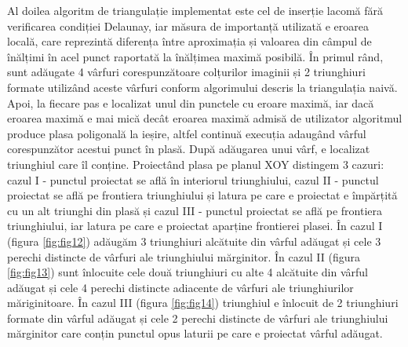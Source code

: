 \documentclass[12pt]{article}
\begin{document}
Al doilea algoritm de triangulație implementat este cel de inserție lacomă fără verificarea condiției Delaunay, iar măsura de importanță utilizată e eroarea locală, care reprezintă diferența între aproximația și valoarea din câmpul de înălțimi în acel punct raportată la înălțimea maximă posibilă. În primul rând, sunt adăugate 4 vârfuri corespunzătoare colțurilor imaginii și 2 triunghiuri formate utilizând aceste vârfuri conform algorimului descris la triangulația naivă. Apoi, la fiecare pas e localizat unul din punctele cu eroare maximă, iar dacă eroarea maximă e mai mică decât eroarea maximă admisă de utilizator algoritmul produce plasa poligonală la ieșire, altfel continuă execuția adaugând vârful corespunzător acestui punct în plasă. După adăugarea unui vârf, e localizat triunghiul care îl conține. Proiectând plasa pe planul XOY distingem 3 cazuri: cazul I - punctul proiectat se află în interiorul triunghiului, cazul II - punctul proiectat se află pe frontiera triunghiului și latura pe care e proiectat e împărțită cu un alt triunghi din plasă și cazul III - punctul proiectat se află pe frontiera triunghiului, iar latura pe care e proiectat aparține frontierei plasei. În cazul I (figura \ref{fig:fig12}) adăugăm 3 triunghiuri alcătuite din vârful adăugat și cele 3 perechi distincte de vârfuri ale triunghiului mărginitor. În cazul II (figura \ref{fig:fig13}) sunt înlocuite cele două triunghiuri cu alte 4 alcătuite din vârful adăugat și cele 4 perechi distincte adiacente de vârfuri ale triunghiurilor măriginitoare. În cazul III (figura \ref{fig:fig14}) triunghiul e înlocuit de 2 triunghiuri formate din vârful adăugat și cele 2 perechi distincte de vârfuri ale triunghiului mărginitor care conțin punctul opus laturii pe care e proiectat vârful adăugat.
\end{document}
